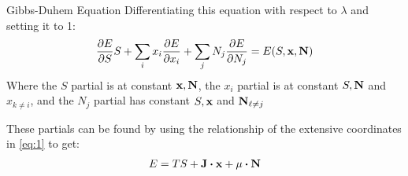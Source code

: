 \documentclass{beamer}
\begin{document}
\begin{frame}{Gibbs-Duhem Equation}
  Differentiating this equation with respect to $\lambda$ and setting it to 1:
  \begin{align*}
    \pdv{E}{S}S+\sum_ix_i\pdv{E}{x_i}+\sum_{j}N_j\pdv{E}{N_j}=E(S,\vb{x},\vb{N})
  \end{align*}
  Where the $S$ partial is at constant $\vb{x,N}$, the $x_i$ partial is at constant $S,\vb{N}$ and $x_{k\neq i}$, and the $N_j$ partial has constant $S,\vb{x}$ and $\vb{N}_{\ell\neq j}$

  These partials can be found by using the relationship of the extensive coordinates in \eqref{eq:1} to get:
  \begin{align*}
    E=TS+\vb{J\vdot x}+\vb{\mu\vdot N}
  \end{align*}
\end{frame}
\end{document}
